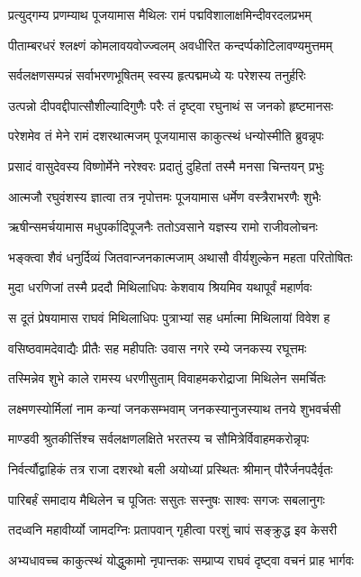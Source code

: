 \twolineshloka
{प्रत्युद्गम्य प्रणम्याथ पूजयामास मैथिलः}
{रामं पद्मविशालाक्षमिन्दीवरदलप्रभम्}%

\twolineshloka
{पीताम्बरधरं श्लक्ष्णं कोमलावयवोज्ज्वलम्}
{अवधीरित कन्दर्प्पकोटिलावण्यमुत्तमम्}%

\twolineshloka
{सर्वलक्षणसम्पन्नं सर्वाभरणभूषितम्}
{स्वस्य हृत्पद्ममध्ये यः परेशस्य तनुर्हरिः}%

\twolineshloka
{उत्पन्नो दीपवद्दीपात्सौशील्यादिगुणैः परैः}
{तं दृष्ट्वा रघुनाथं स जनको हृष्टमानसः}%

\twolineshloka
{परेशमेव तं मेने रामं दशरथात्मजम्}
{पूजयामास काकुत्स्थं धन्योस्मीति ब्रुवन्नृपः}%

\twolineshloka
{प्रसादं वासुदेवस्य विष्णोर्मेने नरेश्वरः}
{प्रदातुं दुहितां तस्मै मनसा चिन्तयन् प्रभुः}%

\twolineshloka
{आत्मजौ रघुवंशस्य ज्ञात्वा तत्र नृपोत्तमः}
{पूजयामास धर्मेण वस्त्रैराभरणैः शुभैः}%

\twolineshloka
{ऋषीन्समर्चयामास मधुपर्कादिपूजनैः}
{ततोऽवसाने यज्ञस्य रामो राजीवलोचनः}%

\twolineshloka
{भङ्क्त्वा शैवं धनुर्दिव्यं जितवान्जनकात्मजाम्}
{अथासौ वीर्यशुल्केन महता परितोषितः}%

\twolineshloka
{मुदा धरणिजां तस्मै प्रददौ मिथिलाधिपः}
{केशवाय श्रियमिव यथापूर्वं महार्णवः}%

\twolineshloka
{स दूतं प्रेषयामास राघवं मिथिलाधिपः}
{पुत्राभ्यां सह धर्मात्मा मिथिलायां विवेश ह}%

\twolineshloka
{वसिष्ठवामदेवाद्यैः प्रीतैः सह महीपतिः}
{उवास नगरे रम्ये जनकस्य रघूत्तमः}%

\twolineshloka
{तस्मिन्नेव शुभे काले रामस्य धरणीसुताम्}
{विवाहमकरोद्राजा मिथिलेन समर्चितः}%

\twolineshloka
{लक्ष्मणस्योर्मिलां नाम कन्यां जनकसम्भवाम्}
{जनकस्यानुजस्याथ तनये शुभवर्चसी}%

\twolineshloka
{माण्डवी श्रुतकीर्त्तिश्च सर्वलक्षणलक्षिते}
{भरतस्य च सौमित्रेर्विवाहमकरोन्नृपः}%

\twolineshloka
{निर्वर्त्यौद्वाहिकं तत्र राजा दशरथो बली}
{अयोध्यां प्रस्थितः श्रीमान् पौरैर्जनपदैर्वृतः}%

\twolineshloka
{पारिबर्हं समादाय मैथिलेन च पूजितः}
{ससुतः सस्नुषः साश्वः सगजः सबलानुगः}%

\twolineshloka
{तदध्वनि महावीर्य्यो जामदग्निः प्रतापवान्}
{गृहीत्वा परशुं चापं सङ्क्रुद्ध इव केसरी}%

\twolineshloka
{अभ्यधावच्च काकुत्स्थं योद्धुकामो नृपान्तकः}
{सम्प्राप्य राघवं दृष्ट्वा वचनं प्राह भार्गवः}%

